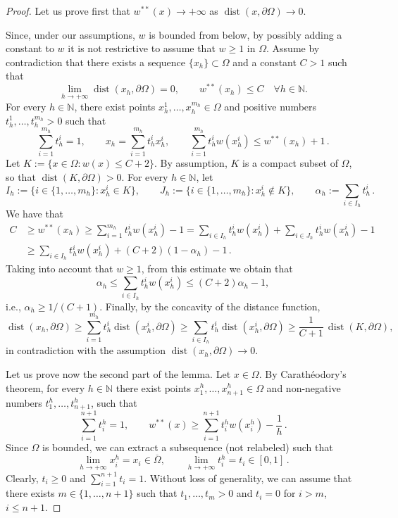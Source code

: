 \documentclass[11pt]{amsart}
\theoremstyle{definition}
\theoremstyle{remark}
\def\N{\mathbb{N}}
\DeclareMathOperator{\dist}{dist}
\begin{document}
\begin{proof}
Let us prove first that $w^{**}(x) \to +\infty$ 
as $\dist(x, \partial\Omega) \to 0$.

Since, under our assumptions, $w$ is bounded from below,
by possibly adding a constant to $w$ it is not restrictive to 
assume that $w\geq 1$ in $\Omega$.
Assume by contradiction that there exists a sequence $\{x_h\}\subset \Omega$ and a constant $C>1$ such that
\[
\lim_{h\to +\infty} \dist (x_h, \partial\Omega) = 0,
\qquad
w^{**}(x_h) \leq C\quad \forall h\in\N.
\]
For every $h\in\N$, there exist points
$x_h^1,\ldots, x_h^{m_h}\in\Omega$
 and positive numbers $t_h^1, \ldots , t_h^{m_h}> 0$ such that
\[
\sum_{i=1}^{m_h} t_h^i = 1,
\qquad
x_h = \sum_{i=1}^{m_h} t_h^i x_h^i,
\qquad
\sum_{i=1}^{m_h} t_h^i w(x_h^i) \leq w^{**}(x_h) +1\,.
\]
Let $K := \{x\in\Omega\colon w(x) \leq C+2\}$.
By assumption, $K$ is a compact subset of $\Omega$, 
so that $\dist(K, \partial\Omega) > 0$.
For every $h\in\N$, let
\[
I_h :=\big  \{i\in\{1,\ldots,m_h\}\colon x_h^i\in K \big \},
\qquad
J_h := \big  \{i\in\{1,\ldots,m_h\}\colon x_h^i\not\in K \big \},
\qquad
\alpha_h := \sum_{i\in I_h} t_h^i\,.
\]
We have that
\[
\begin{split}
C & \geq w^{**}(x_h) \geq   \sum_{i=1}^{m_h} t_h^i w(x_h^i) -1
=
\sum_{i\in I_h} t_h^i w(x_h^i)
+ \sum_{i\in J_h} t_h^i w(x_h^i) -1
\\ & \geq
\sum_{i\in I_h} t_h^i w(x_h^i) + (C+2) (1-\alpha_h) -1\,.
\end{split}
\]
Taking into account that $w\geq 1$, from this estimate
we obtain that
\[
\alpha_h \leq \sum_{i\in I_h} t_h^i w(x_h^i)
\leq (C+2)\alpha_h - 1,
\]
i.e.,
$\alpha_h \geq 1/(C+1)$.
Finally, by the concavity of the distance function,
\[
\dist(x_h, \partial\Omega) \geq
\sum_{i=1}^{m_h} t_h^i \dist(x_h^i, \partial\Omega)
\geq
\sum_{i\in I_h} t_h^i \dist(x_h^i, \partial\Omega)
\geq \frac{1}{C+1}\, \dist(K, \partial\Omega), 
\]
in contradiction with the assumption
$\dist(x_h, \partial\Omega)\to 0$.

\smallskip
Let us prove now the second part of the lemma.
Let $x\in\Omega$.
By Carathéodory's theorem, for every $h\in\N$ there exist points
$x^h_1, \ldots, x^h_{n+1} \in \Omega$
and non-negative numbers $t^ h_1, \ldots, t^ h_{n+1}$, such that
\begin{equation}
\label{f:approx}
\sum_{i=1}^{n+1} t^ h_i = 1, 
\qquad
w^{**}(x) \geq \sum_{i=1}^{n+1} t^ h_i w(x^ h_i) - \frac{1}{h}\,.
\end{equation}
Since $\Omega$ is bounded, we can extract a subsequence (not relabeled) such that
\[
\lim_{h \to +\infty} x^ h_i= x_ i \in \overline{\Omega},
\qquad
\lim_{h \to +\infty}  t^ h_i= t_ i \in [0,1]\,.
\]
Clearly, $t_i\geq 0$ and $\sum_{i=1}^{n+1} t_i = 1$.
Without loss of generality, we can assume that 
there exists $m\in \{1, \ldots, n+1\}$ such that 
$t_1, \ldots, t_m > 0$ and $t_i = 0$ for $i> m$, $i\leq n+1$.


\end{proof}
\end{document}
